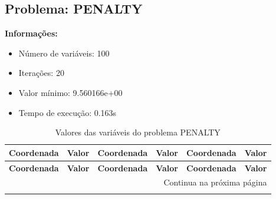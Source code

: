 \documentclass[12pt]{article}
\begin{document}
\newpage            
\subsection{Problema: PENALTY}

\textbf{Informações:}
\begin{itemize}
\item Número de variáveis: 100
\item Iterações: 20
\item Valor mínimo: 9.560166e+00
\item Tempo de execução: 0.163s
\end{itemize}

\small
\begin{longtable}{@{}cc|cc|cc@{}}
\caption{Valores das variáveis do problema PENALTY} \\
\toprule
\textbf{Coordenada} & \textbf{Valor} & \textbf{Coordenada} & \textbf{Valor} & \textbf{Coordenada} & \textbf{Valor} \\
\midrule
\endfirsthead

\toprule
\textbf{Coordenada} & \textbf{Valor} & \textbf{Coordenada} & \textbf{Valor} & \textbf{Coordenada} & \textbf{Valor} \\
\midrule
\endhead

\midrule \multicolumn{6}{r}{{Continua na próxima página}} \\ \midrule
\endfoot


\end{longtable}
\end{document}
